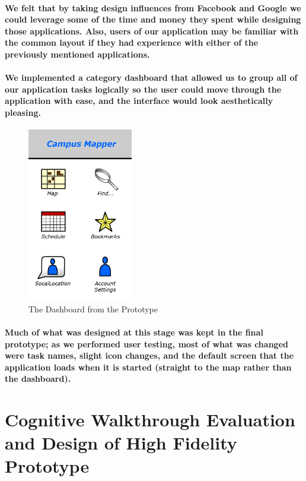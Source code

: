 \documentclass{report}
\begin{document}
    \paragraph{We felt that by taking design influences from Facebook and Google
    we could leverage some of the time and money they spent while designing those
    applications. Also, users of our application may be familiar with the common
    layout if they had experience with either of the previously mentioned
    applications.}
    \paragraph{We implemented a category dashboard that allowed us to group all
    of our application tasks logically so the user could move through the
    application with ease, and the interface would look aesthetically pleasing.}
    \begin{figure}
        \centering
            \includegraphics[height=3in]{img/figure433.png}
        \caption{The Dashboard from the Prototype}
    \end{figure}
    \paragraph{Much of what was designed at this stage was kept in the final
    prototype; as we performed user testing, most of what was changed were task
    names, slight icon changes, and the default screen that the application loads
    when it is started (straight to the map rather than the dashboard).}
\section{Cognitive Walkthrough Evaluation and Design of High Fidelity
Prototype}
\end{document}
